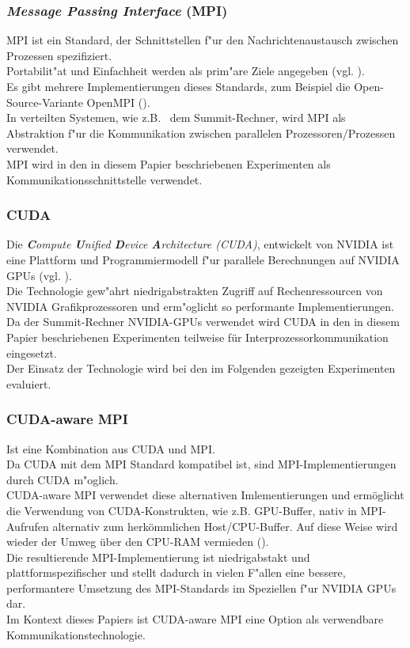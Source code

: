 \subsubsection{ \textit{Message Passing Interface} (MPI) }
MPI ist ein Standard, der Schnittstellen f"ur den Nachrichtenaustausch zwischen Prozessen spezifiziert.\\
Portabilit"at und Einfachheit werden als prim"are Ziele angegeben (vgl. \cite[Kap. 1.1]{mpi}).\\
Es gibt mehrere Implementierungen dieses Standards, zum Beispiel die Open-Source-Variante OpenMPI (\cite{openmpi}).\\
In verteilten Systemen, wie z.B.~ dem Summit-Rechner, wird MPI als Abstraktion f"ur die Kommunikation zwischen parallelen Prozessoren/Prozessen verwendet.\\
MPI wird in den in diesem Papier beschriebenen Experimenten als Kommunikationsschnittstelle verwendet.

\subsubsection{ CUDA }
Die \textit{\textbf{C}ompute \textbf{U}nified \textbf{D}evice \textbf{A}rchitecture (CUDA)}, entwickelt von NVIDIA ist eine Plattform und Programmiermodell f"ur parallele Berechnungen auf NVIDIA GPUs (vgl. \cite{cuda}).\\
Die Technologie gew"ahrt niedrigabstrakten Zugriff auf Rechenressourcen von NVIDIA Grafikprozessoren und erm"oglicht so performante Implementierungen.\\
Da der Summit-Rechner NVIDIA-GPUs verwendet wird CUDA in den in diesem Papier beschriebenen Experimenten teilweise für Interprozessorkommunikation eingesetzt.\\
Der Einsatz der Technologie wird bei den im Folgenden gezeigten Experimenten evaluiert.


\subsubsection{ CUDA-aware MPI }
Ist eine Kombination aus CUDA und MPI.\\
Da CUDA mit dem MPI Standard kompatibel ist, sind MPI-Implementierungen durch CUDA m"oglich.\\
CUDA-aware MPI verwendet diese alternativen Imlementierungen und ermöglicht die Verwendung von CUDA-Konstrukten, wie z.B. GPU-Buffer, nativ in MPI-Aufrufen alternativ zum herkömmlichen Host/CPU-Buffer. Auf diese Weise wird wieder der Umweg über den CPU-RAM vermieden (\cite{cudampi}).\\
Die resultierende MPI-Implementierung ist niedrigabstakt und plattformspezifischer und stellt dadurch in vielen F"allen eine bessere, performantere Umsetzung des MPI-Standards im Speziellen f"ur NVIDIA GPUs dar.\\
Im Kontext dieses Papiers ist CUDA-aware MPI eine Option als verwendbare Kommunikationstechnologie.

